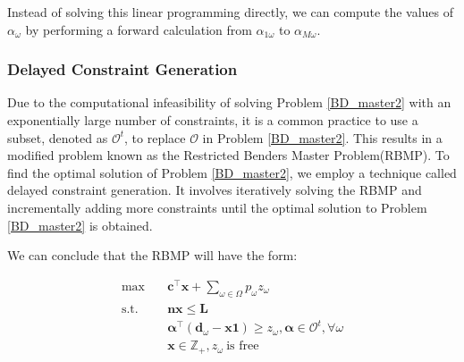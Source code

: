 
Instead of solving this linear programming directly, we can compute the values of $\alpha_{\omega}$ by performing a forward calculation from $\alpha_{1\omega}$ to $\alpha_{M\omega}$.

\subsubsection{Delayed Constraint Generation}\label{bender_stage}

Due to the computational infeasibility of solving Problem \eqref{BD_master2} with an exponentially large number of constraints, it is a common practice to use a subset, denoted as $\mathcal{O}^t$, to replace $\mathcal{O}$ in Problem \eqref{BD_master2}. This results in a modified problem known as the Restricted Benders Master Problem(RBMP). To find the optimal solution of Problem \eqref{BD_master2}, we employ a technique called delayed constraint generation. It involves iteratively solving the RBMP and incrementally adding more constraints until the optimal solution to Problem \eqref{BD_master2} is obtained.


We can conclude that the RBMP will have the form:

\begin{equation}\label{BD_master3}
  \begin{aligned}
    \max \quad & \mathbf{c}^{\intercal} \mathbf{x} + \sum_{\omega \in \Omega} p_{\omega} z_{\omega} \\
    \text {s.t.} \quad & \mathbf{n} \mathbf{x} \leq \mathbf{L} \\
    & \bm{\alpha}^{\intercal}(\mathbf{d}_{\omega}- \mathbf{x} \mathbf{1}) \geq z_{\omega}, \bm{\alpha} \in \mathcal{O}^{t}, \forall \omega \\
     & \mathbf{x} \in \mathbb{Z}_{+}, z_{\omega} ~\text{is free}
  \end{aligned}
\end{equation}

